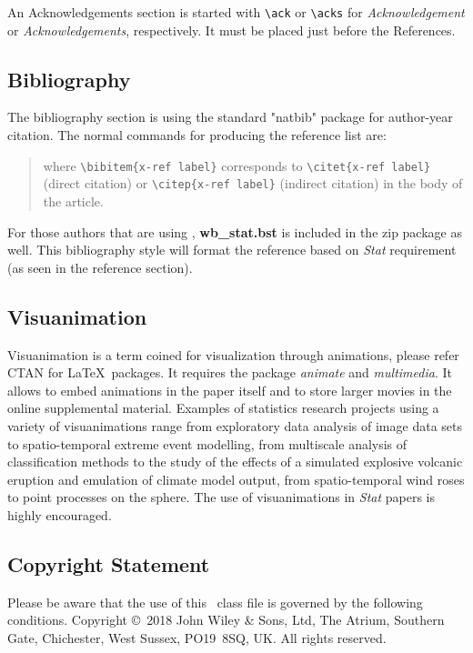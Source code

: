 \documentclass[cmbright]{WileySTAT-V1} %
\theoremstyle{plain}
\begin{document}
An Acknowledgements section is started with \verb"\ack" or \verb"\acks" for \textit{Acknowledgement} or \textit{Acknowledgements}, respectively. It must be placed just before the References.

\subsection{Bibliography}\label{sec4.12}

The bibliography section is using the standard "natbib" package for author-year citation. The normal commands for producing the reference list are:
\begin{quote}
where \verb"\bibitem{x-ref label}" corresponds to \verb"\citet{x-ref label}" (direct citation) or \verb"\citep{x-ref label}" (indirect citation) in the body of the article.
\end{quote}

For those authors that are using \BibTeX, \textbf{wb\_stat.bst} is included in the zip package as well. This bibliography style will format the reference based on \textit{Stat} requirement (as seen in the reference section).

\subsection{Visuanimation}\label{sec4.13}

Visuanimation is a term coined for visualization through animations, please refer CTAN for \LaTeX\ packages. It requires the package \textit{animate} and \textit{multimedia}. It allows to embed animations in the paper itself and to store larger movies in the online supplemental material. Examples of statistics research projects using a variety of visuanimations range from exploratory data analysis of image data sets to spatio-temporal extreme event modelling, from multiscale analysis of classification methods to the study of the effects of a simulated explosive volcanic eruption and emulation of climate model output, from spatio-temporal wind roses to point processes on the sphere. The use of visuanimations in \textit{Stat} papers is highly encouraged.

\subsection{Copyright Statement}

Please be aware that the use of this \LaTeXe\ class file is governed by the following conditions.
Copyright \copyright\ 2018 John Wiley \& Sons, Ltd, The Atrium, Southern Gate, Chichester, West Sussex, PO19~8SQ, UK. All rights reserved.
\end{document}
